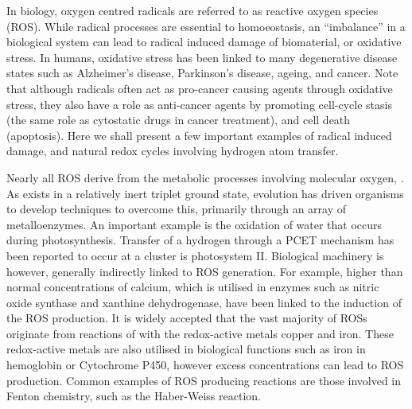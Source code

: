 In biology, oxygen centred radicals are referred to as reactive oxygen species
(ROS). While radical
processes are essential to homoeostasis, an ``imbalance'' in a biological system
can lead to radical induced damage of biomaterial, or oxidative
stress.\cite{Halliwell2015} In humans, oxidative stress has been linked to many
degenerative disease states such as Alzheimer's
disease,\cite{Barnham2004,Valko2007} Parkinson's disease,\cite{Hwang2013}
ageing, and cancer.\cite{Halliwell2007} Note that although radicals often act as
pro-cancer causing agents through oxidative stress, they also have a role as
anti-cancer agents by promoting cell-cycle stasis (the same role as cytostatic
drugs in cancer treatment), and cell death (apoptosis). Here we shall present a
few important examples of radical induced damage, and natural redox cycles
involving hydrogen atom transfer.


Nearly all ROS derive from the metabolic processes involving molecular oxygen,
.\cite{Barnham2004} As  exists in a relatively inert triplet
ground state, evolution has driven organisms to develop techniques to overcome
this, primarily through an array of metalloenzymes. An important example is the
oxidation of water that occurs during photosynthesis. Transfer of a hydrogen
through a PCET mechanism has been reported to occur at a  cluster is
photosystem II.\cite{Hoganson1997,Umena2011} Biological machinery is however,
generally indirectly linked to ROS generation. For example, higher than normal
concentrations of calcium, which is utilised in enzymes such as nitric oxide
synthase and xanthine dehydrogenase, have been linked to the induction of the
ROS production.\cite{Lewen2000} It is widely accepted that the vast majority of
ROSs originate from reactions of  with the redox-active metals copper and
iron.\cite{Halliwell2015} These redox-active metals are also utilised in
biological functions such as iron in hemoglobin or Cytochrome P450, however
excess concentrations can lead to ROS production. Common examples of ROS
producing reactions are those involved in Fenton chemistry, such as the
Haber-Weiss reaction. 


